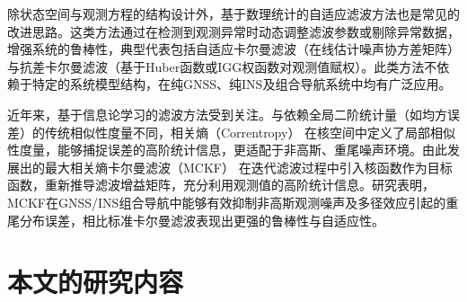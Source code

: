 
除状态空间与观测方程的结构设计外，基于数理统计的自适应滤波方法也是常见的改进思路。这类方法通过在检测到观测异常时动态调整滤波参数或剔除异常数据，增强系统的鲁棒性，典型代表包括自适应卡尔曼滤波（在线估计噪声协方差矩阵）与抗差卡尔曼滤波（基于Huber函数或IGG权函数对观测值赋权）\cite{Sage1969AdaptiveFW,yang2010robust}。此类方法不依赖于特定的系统模型结构，在纯GNSS、纯INS及组合导航系统中均有广泛应用。

近年来，基于信息论学习的滤波方法受到关注。与依赖全局二阶统计量（如均方误差）的传统相似性度量不同，相关熵（Correntropy） 在核空间中定义了局部相似性度量，能够捕捉误差的高阶统计信息，更适配于非高斯、重尾噪声环境。由此发展出的最大相关熵卡尔曼滤波（MCKF） 在迭代滤波过程中引入核函数作为目标函数，重新推导滤波增益矩阵，充分利用观测值的高阶统计信息\cite{izanloo2016kalman,CHEN201770}。研究表明，MCKF在GNSS/INS组合导航中能够有效抑制非高斯观测噪声及多径效应引起的重尾分布误差，相比标准卡尔曼滤波表现出更强的鲁棒性与自适应性\cite{xie2025adaptive,CHEN201770}。



\section{本文的研究内容}

